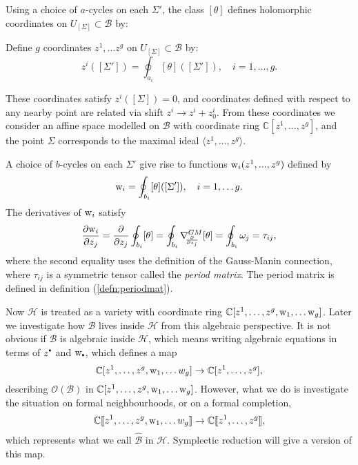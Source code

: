     Using a choice of \(a\)-cycles on each \(\Sigma'\), the class \([\theta]\) defines holomorphic coordinates on \( U_{[\Sigma]}\subset\mathcal{B}\) by:
    \begin{defn}  Define \(g\) coordinates \( {z^1, \dots z^g}\) on \(U_{[\Sigma]} \subset \mathcal{B}\) by: 
    \begin{equation}  \label{eqn:zcoords}
        z^i([\Sigma'])=\oint_{a_i}[\theta]([\Sigma']),\quad i=1,\dots,g.
    \end{equation}
    \end{defn}
    These coordinates satisfy \(z^i([\Sigma])=0\), and coordinates defined with respect to any nearby point are related via shift \(z^i\rightarrow z^i+z^i_0\). From these coordinates we consider an affine space modelled on \( \mathcal{B}\) with coordinate ring \( \mathbb{C}[z^1, \dots , z^g]\), and the point \(\Sigma\) corresponds to the maximal ideal \( \langle z^1, \dots , z^g\rangle\). 
    
    A choice of \(b\)-cycles on each \(\Sigma'\) give rise to functions \(\mathrm{w}_i(z^1,...,z^g)\) defined by 
    \begin{equation} 
    \label{eqn:wcoords}
    \mathrm{w}_i=\oint_{b_i}[\theta]([\Sigma']), \quad i = 1, \dots g.
    \end{equation}
    The derivatives of \(\mathrm{w}_i\) satisfy
    \[ \frac{\partial \mathrm{w}_i}{\partial z_j}=\frac{\partial}{\partial z_j}\oint_{b_i}[\theta]=\oint_{b_i}\nabla^{GM}_{\hspace{-1mm}\frac{\partial}{\partial z_j}}[\theta]=\oint_{b_i}\omega_j=\tau_{ij},\]
    where the second equality uses the definition of the Gauss-Manin connection, where \(\tau_{ij}\) is a symmetric tensor called the \emph{period matrix}. The period matrix is defined in definition (\ref{defn:periodmat}).
    
    Now \( \mathcal{H}\) is treated as a variety with coordinate ring \( \mathbb{C}[z^1, \dots , z^g, \mathrm{w}_1, \dots \mathrm{w}_g]\). Later we investigate how \( \mathcal{B}\) lives inside \( \mathcal{H}\) from this algebraic perspective.  It is not obvious if \( \mathcal{B}\) is algebraic inside \( \mathcal{H}\), which means writing algebraic equations in terms of \(z^{\sbt}\) and \(\w_{\sbt}\), which defines a map \[ \mathbb{C}[z^1, \dots , z^g, \mathrm{w}_1, \dots w_g] \rightarrow \mathbb{C} [ z^1, \dots , z^g ], \]
    describing \( \mathcal{O}(\mathcal{B})\) in \( \mathbb{C}[z^1, \dots , z^g, \mathrm{w}_1, \dots \mathrm{w}_g]\). 
    However, what we do is investigate the situation on formal neighbourhoods, or on a formal completion, 
    \[ \mathbb{C} [\![ z^1, \dots , z^g, \mathrm{w}_1, \dots w_g ]\!] \rightarrow \mathbb{C} 
    [\![ z^1, \dots , z^g ]\!], \]
    which represents what we call \( \widehat{\mathcal{B}}\) in \( \mathcal{H}\). Symplectic reduction will give a version of this map.
    
